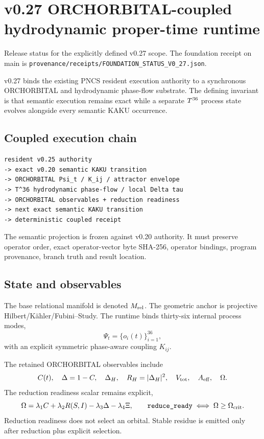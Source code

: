\chapter{v0.27 ORCHORBITAL-coupled hydrodynamic proper-time runtime}

\begin{statusbox}{Release status}
 for the explicitly defined v0.27 scope. The foundation receipt on main is \texttt{provenance/receipts/FOUNDATION\_STATUS\_V0\_27.json}.
\end{statusbox}

v0.27 binds the existing PNCS resident execution authority to a synchronous ORCHORBITAL and hydrodynamic phase-flow substrate. The defining invariant is that semantic execution remains exact while a separate \(T^{36}\) process state evolves alongside every semantic KAKU occurrence.

\section{Coupled execution chain}
\begin{lstlisting}
resident v0.25 authority
-> exact v0.20 semantic KAKU transition
-> ORCHORBITAL Psi_t / K_ij / attractor envelope
-> T^36 hydrodynamic phase-flow / local Delta tau
-> ORCHORBITAL observables + reduction readiness
-> next exact semantic KAKU transition
-> deterministic coupled receipt
\end{lstlisting}

The semantic projection is frozen against v0.20 authority. It must preserve operator order, exact operator-vector byte SHA-256, operator bindings, program provenance, branch truth and result location.

\section{State and observables}
The base relational manifold is denoted \(M_{\rm rel}\). The geometric anchor is projective Hilbert/K\"ahler/Fubini--Study. The runtime binds thirty-six internal process modes,
\[
\Psi_t=\{o_i(t)\}_{i=1}^{36},
\]
with an explicit symmetric phase-aware coupling \(K_{ij}\).

The retained ORCHORBITAL observables include
\[
C(t),\quad \Delta=1-C,\quad \Delta_H,\quad R_H=|\Delta_H|^2,
\quad V_{\rm tot},\quad A_{\rm eff},\quad \Omega.
\]
The reduction readiness scalar remains explicit,
\[
\Omega=\lambda_1C+\lambda_2R(S,I)-\lambda_3\Delta-\lambda_4\Xi,
\qquad \texttt{reduce\_ready}\iff \Omega\ge\Omega_{\rm crit}.
\]
Reduction readiness does not select an orbital. Stable residue is emitted only after reduction plus explicit selection.

